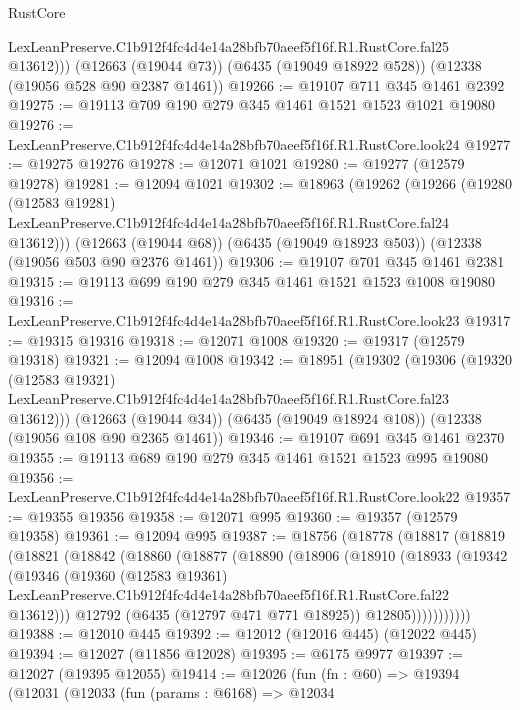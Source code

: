 \begin{lexlean}{RustCore}
\begin{coremodule}
          LexLeanPreserve.C1b912f4fc4d4e14a28bfb70aeef5f16f.R1.RustCore.fal25
          @13612)))
    (@12663 (@19044 @73))
    (@6435 (@19049 @18922 @528))
    (@12338 (@19056 @528 @90 @2387 @1461))
@19266 := @19107 @711 @345 @1461 @2392
@19275 := @19113 @709 @190 @279 @345 @1461 @1521 @1523 @1021 @19080
@19276 := LexLeanPreserve.C1b912f4fc4d4e14a28bfb70aeef5f16f.R1.RustCore.look24
@19277 := @19275 @19276
@19278 := @12071 @1021
@19280 := @19277 (@12579 @19278)
@19281 := @12094 @1021
@19302 := @18963
    (@19262
      (@19266
        (@19280
          (@12583 @19281)
          LexLeanPreserve.C1b912f4fc4d4e14a28bfb70aeef5f16f.R1.RustCore.fal24
          @13612)))
    (@12663 (@19044 @68))
    (@6435 (@19049 @18923 @503))
    (@12338 (@19056 @503 @90 @2376 @1461))
@19306 := @19107 @701 @345 @1461 @2381
@19315 := @19113 @699 @190 @279 @345 @1461 @1521 @1523 @1008 @19080
@19316 := LexLeanPreserve.C1b912f4fc4d4e14a28bfb70aeef5f16f.R1.RustCore.look23
@19317 := @19315 @19316
@19318 := @12071 @1008
@19320 := @19317 (@12579 @19318)
@19321 := @12094 @1008
@19342 := @18951
    (@19302
      (@19306
        (@19320
          (@12583 @19321)
          LexLeanPreserve.C1b912f4fc4d4e14a28bfb70aeef5f16f.R1.RustCore.fal23
          @13612)))
    (@12663 (@19044 @34))
    (@6435 (@19049 @18924 @108))
    (@12338 (@19056 @108 @90 @2365 @1461))
@19346 := @19107 @691 @345 @1461 @2370
@19355 := @19113 @689 @190 @279 @345 @1461 @1521 @1523 @995 @19080
@19356 := LexLeanPreserve.C1b912f4fc4d4e14a28bfb70aeef5f16f.R1.RustCore.look22
@19357 := @19355 @19356
@19358 := @12071 @995
@19360 := @19357 (@12579 @19358)
@19361 := @12094 @995
@19387 := @18756
    (@18778
      (@18817
        (@18819
          (@18821
            (@18842
              (@18860
                (@18877
                  (@18890
                    (@18906
                      (@18910
                        (@18933
                          (@19342
                            (@19346
                              (@19360
                                (@12583 @19361)
                                LexLeanPreserve.C1b912f4fc4d4e14a28bfb70aeef5f16f.R1.RustCore.fal22
                                @13612)))
                          @12792
                          (@6435 (@12797 @471 @771 @18925))
                          @12805)))))))))))
@19388 := @12010 @445
@19392 := @12012 (@12016 @445) (@12022 @445)
@19394 := @12027 (@11856 @12028)
@19395 := @6175 @9977
@19397 := @12027 (@19395 @12055)
@19414 := @12026
    (fun (fn : @60) =>
    @19394
      (@12031
        (@12033
          (fun (params : @6168) =>
          @12034

\end{coremodule}
\end{lexlean}

